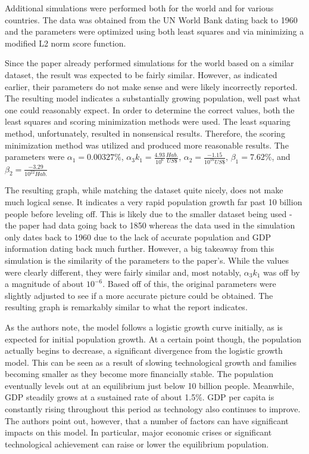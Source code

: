 \documentclass[a4paper]{article}
\begin{document}
Additional simulations were performed both for the world and for various countries. The data was obtained from the UN World Bank dating back to 1960 and the parameters were optimized using both least squares and via minimizing a modified L2 norm score function.

Since the paper already performed simulations for the world based on a similar dataset, the result was expected to be fairly similar. However, as indicated earlier, their parameters do not make sense and were likely incorrectly reported. The resulting model indicates a substantially growing population, well past what one could reasonably expect. In order to determine the correct values, both the least squares and scoring minimization methods were used. The least squaring method, unfortunately, resulted in nonsensical results. Therefore, the scoring minimization method was utilized and produced more reasonable results. The parameters were $\alpha_1 =0.00327\%$, $\alpha_3 k_1 = \frac{4.93}{10^6} \frac{Hab.}{US \$}$, $\alpha_2 = \frac{-1.15}{10^{16} US \$}$, $\beta_1 = 7.62\%$, and $\beta_2 = \frac{-3.29}{10^{22} Hab.}$ 

The resulting graph, while matching the dataset quite nicely, does not make much logical sense. It indicates a very rapid population growth far past 10 billion people before leveling off. This is likely due to the smaller dataset being used - the paper had data going back to 1850 whereas the data used in the simulation only dates back to 1960 due to the lack of accurate population and GDP information dating back much further. However, a big takeaway from this simulation is the similarity of the parameters to the paper's. While the values were clearly different, they were fairly similar and, most notably, $\alpha_3 k_1$ was off by a magnitude of about $10^{-6}$. Based off of this, the original parameters were slightly adjusted to see if a more accurate picture could be obtained. The resulting graph is remarkably similar to what the report indicates. 

As the authors note, the model follows a logistic growth curve initially, as is expected for initial population growth. At a certain point though, the population actually begins to decrease, a significant divergence from the logistic growth model. This can be seen as a result of slowing technological growth and families becoming smaller as they become more financially stable. The population eventually levels out at an equilibrium just below 10 billion people. Meanwhile, GDP steadily grows at a sustained rate of about 1.5\%. GDP per capita is constantly rising throughout this period as technology also continues to improve. The authors point out, however, that a number of factors can have significant impacts on this model. In particular, major economic crises or significant technological achievement can raise or lower the equilibrium population. 
\end{document}
